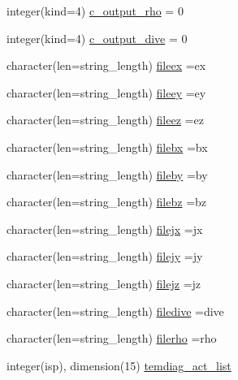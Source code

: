 \begin{DoxyCompactItemize}
\item 
integer(kind=4) \hyperlink{namespaceoutput__data_afab9a486a2aff0dc3d89dbbcc7bb3007}{c\+\_\+output\+\_\+rho} = 0
\item 
integer(kind=4) \hyperlink{namespaceoutput__data_aa7538787d744441b4f595752dabc3897}{c\+\_\+output\+\_\+dive} = 0
\item 
character(len=string\+\_\+length) \hyperlink{namespaceoutput__data_aa8d95fb60904ef94d39d3c06ebc6d4d7}{fileex} =\textquotesingle{}ex\textquotesingle{}
\item 
character(len=string\+\_\+length) \hyperlink{namespaceoutput__data_a368d30c58c5484d6e8caf5e536d2da0c}{fileey} =\textquotesingle{}ey\textquotesingle{}
\item 
character(len=string\+\_\+length) \hyperlink{namespaceoutput__data_ab01ba0f2c67ee55da96a855e8da8382c}{fileez} =\textquotesingle{}ez\textquotesingle{}
\item 
character(len=string\+\_\+length) \hyperlink{namespaceoutput__data_ac0a6ec606c33d1bc037b5ce85a9f4b3a}{filebx} =\textquotesingle{}bx\textquotesingle{}
\item 
character(len=string\+\_\+length) \hyperlink{namespaceoutput__data_ac6e874f0a8121e42bed35e449a4a7c38}{fileby} =\textquotesingle{}by\textquotesingle{}
\item 
character(len=string\+\_\+length) \hyperlink{namespaceoutput__data_a07a77b208c10f32c5723378f16ea4301}{filebz} =\textquotesingle{}bz\textquotesingle{}
\item 
character(len=string\+\_\+length) \hyperlink{namespaceoutput__data_a1e0f229429f07c107635c7844afa8d39}{filejx} =\textquotesingle{}jx\textquotesingle{}
\item 
character(len=string\+\_\+length) \hyperlink{namespaceoutput__data_afaf1fb3c71c81a246f6af6ca881610ec}{filejy} =\textquotesingle{}jy\textquotesingle{}
\item 
character(len=string\+\_\+length) \hyperlink{namespaceoutput__data_a3656388605a302a6fc4c579fe82eb10b}{filejz} =\textquotesingle{}jz\textquotesingle{}
\item 
character(len=string\+\_\+length) \hyperlink{namespaceoutput__data_a655183a11c6badb83f94a4f05b94f95e}{filedive} =\textquotesingle{}dive\textquotesingle{}
\item 
character(len=string\+\_\+length) \hyperlink{namespaceoutput__data_abd9468ccde074971628171196a7873f2}{filerho} =\textquotesingle{}rho\textquotesingle{}
\item 
integer(isp), dimension(15) \hyperlink{namespaceoutput__data_a8343f9b523163c47d0661619374f3455}{temdiag\+\_\+act\+\_\+list}

\end{DoxyCompactItemize}
